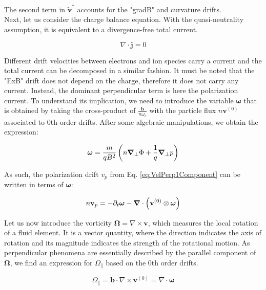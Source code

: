 The second term in $\tilde{\mathbf{v}}^*$ accounts for the "gradB" and curvature drifts. \\

Next, let us consider the charge balance equation. With the quasi-neutrality assumption, it is equivalent to a divergence-free total current.

\begin{equation}
	\label{eq:edge_chargeBalanceEq}
	\nabla \cdot \mathbf{j} = 0
\end{equation}

Different drift velocities between electrons and ion species carry a current and the total current can be decomposed in a similar fashion. It must be noted that the "ExB" drift does not depend on the charge, therefore it does not carry any current. Instead, the dominant perpendicular term is here the polarization current. To understand its implication, we need to introduce the variable $\boldsymbol{\omega}$ that is obtained by taking the cross-product of $\frac{\mathbf{b}}{n\omega_c}$ with the particle flux $n\mathbf{v}^{(0)}$ associated to 0th-order drifts. After some algebraic manipulations, we obtain the expression:

\begin{equation}
	\boldsymbol{\omega} = \frac{m}{qB^2}\left(n\grad_\perp\Phi + \frac{1}{q} \grad_{\perp}p\right) \label{eq:definitionSmallOmega}
\end{equation}

As such, the polarization drift $v_{p}$ from Eq. \ref{eq:VelPerp1Component} can be written in terms of $\boldsymbol{\omega}$:

\begin{equation}
	\label{eq:edge_polarizationCurrentOmega}
	n\mathbf{v}_{p} = -\partial_t\boldsymbol{\omega} - \grad\cdot\left(\mathbf{v}^{(0)}\otimes\boldsymbol{\omega}\right)
\end{equation}

Let us now introduce the vorticity $ \boldsymbol{\Omega} = \nabla \times \mathbf{v}$, which measures the local rotation of a fluid element. It is a vector quantity, where the direction indicates the axis of rotation and its magnitude indicates the strength of the rotational motion. As perpendicular phenomena are essentially described by the parallel component of $\boldsymbol{\Omega}$, we find an expression for $\Omega_\parallel$ based on the 0th order drifts.

\begin{equation}
	\Omega_\parallel = \mathbf{b} \cdot \nabla \times \mathbf{v}^{(0)} = \nabla \cdot \boldsymbol{\omega}
\end{equation}

